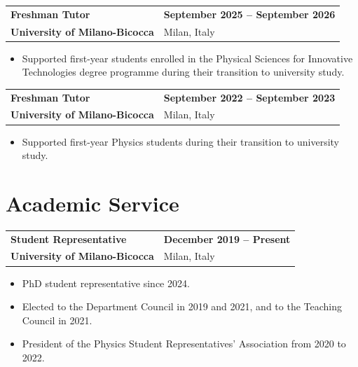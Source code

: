 \documentclass[10pt,a4paper]{article}
\makeatletter
\newcommand{\cvsection}[1]{%
  \Needspace{7\baselineskip}%
  \section{#1}%
}
\newcommand{\cventry}[4]{%
  \Needspace{4\baselineskip}%
  \par\addvspace{0.45em}%
  \begin{tabularx}{\textwidth}{@{}X>{\raggedleft\arraybackslash}p{5.45cm}@{}}
    {\large\bfseries\color{DarkGrey}#1} & {\small\bfseries\color{AccentMuted}#3} \\
    {\bfseries\color{Accent}#2} & {\small\color{BodyGrey}#4}
  \end{tabularx}%
  \vspace{-0.2em}
}
\makeatother
\begin{document}
\cventry{Freshman Tutor}{University of Milano-Bicocca}{September 2025 -- September 2026}{Milan, Italy}
\begin{itemize}
  \item Supported first-year students enrolled in the Physical Sciences for Innovative Technologies degree programme during their transition to university study.
\end{itemize}

\cventry{Freshman Tutor}{University of Milano-Bicocca}{September 2022 -- September 2023}{Milan, Italy}
\begin{itemize}
  \item Supported first-year Physics students during their transition to university study.
\end{itemize}

\cvsection{Academic Service}

\cventry{Student Representative}{University of Milano-Bicocca}{December 2019 -- Present}{Milan, Italy}
\begin{itemize}
  \item PhD student representative since 2024.
  \item Elected to the Department Council in 2019 and 2021, and to the Teaching Council in 2021.
  \item President of the Physics Student Representatives' Association from 2020 to 2022.
\end{itemize}
\end{document}

